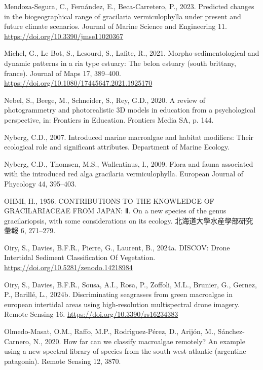 \documentclass[
  letterpaper,
  DIV=11,
  numbers=noendperiod]{scrartcl}
\newlength{\cslhangindent}
\newenvironment{CSLReferences}[2] %
 {\begin{list}{}{%
  \setlength{\itemindent}{0pt}
  \setlength{\leftmargin}{0pt}
  \setlength{\parsep}{0pt}
  \ifodd #1
   \setlength{\leftmargin}{\cslhangindent}
   \setlength{\itemindent}{-1\cslhangindent}
  \fi
  \setlength{\itemsep}{#2\baselineskip}}}
 {\end{list}}
\begin{document}
\begin{CSLReferences}{1}{0}
Mendoza-Segura, C., Fernández, E., Beca-Carretero, P., 2023. Predicted
changes in the biogeographical range of gracilaria vermiculophylla under
present and future climate scenarios. Journal of Marine Science and
Engineering 11. \url{https://doi.org/10.3390/jmse11020367}

Michel, G., Le Bot, S., Lesourd, S., Lafite, R., 2021.
Morpho-sedimentological and dynamic patterns in a ria type estuary: The
belon estuary (south brittany, france). Journal of Maps 17, 389--400.
\url{https://doi.org/10.1080/17445647.2021.1925170}

Nebel, S., Beege, M., Schneider, S., Rey, G.D., 2020. A review of
photogrammetry and photorealistic 3D models in education from a
psychological perspective, in: Frontiers in Education. Frontiers Media
SA, p. 144.

Nyberg, C.D., 2007. Introduced marine macroalgae and habitat modifiers:
Their ecological role and significant attributes. Department of Marine
Ecology.

Nyberg, C.D., Thomsen, M.S., Wallentinus, I., 2009. Flora and fauna
associated with the introduced red alga gracilaria vermiculophylla.
European Journal of Phycology 44, 395--403.

OHMI, H., 1956. CONTRIBUTIONS TO THE KNOWLEDGE OF GRACILARIACEAE FROM
JAPAN: Ⅱ. On a new species of the genus gracilariopsis, with some
considerations on its ecology. 北海道大學水産學部研究彙報 6, 271--279.

Oiry, S., Davies, B.F.R., Pierre, G., Laurent, B., 2024a. {DISCOV: Drone
Intertidal Sediment Classification Of Vegetation}.
\url{https://doi.org/10.5281/zenodo.14218984}

Oiry, S., Davies, B.F.R., Sousa, A.I., Rosa, P., Zoffoli, M.L., Brunier,
G., Gernez, P., Barillé, L., 2024b. Discriminating seagrasses from green
macroalgae in european intertidal areas using high-resolution
multispectral drone imagery. Remote Sensing 16.
\url{https://doi.org/10.3390/rs16234383}

Olmedo-Masat, O.M., Raffo, M.P., Rodrı́guez-Pérez, D., Arijón, M.,
Sánchez-Carnero, N., 2020. How far can we classify macroalgae remotely?
An example using a new spectral library of species from the south west
atlantic (argentine patagonia). Remote Sensing 12, 3870.


\end{CSLReferences}
\end{document}
